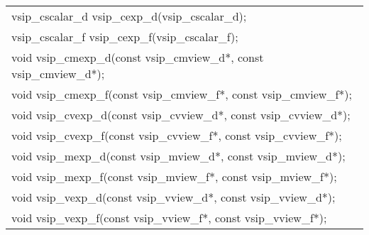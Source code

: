 \\\cvsiplh
\afh
\\\hspace*{.04\textwidth} {
\ttfamily
\begin{tabular}[H]{l}
vsip\_cscalar\_d vsip\_cexp\_d(vsip\_cscalar\_d);\\
vsip\_cscalar\_f vsip\_cexp\_f(vsip\_cscalar\_f);\\
void vsip\_cmexp\_d(const vsip\_cmview\_d*, const vsip\_cmview\_d*);\\
void vsip\_cmexp\_f(const vsip\_cmview\_f*, const vsip\_cmview\_f*);\\
void vsip\_cvexp\_d(const vsip\_cvview\_d*, const vsip\_cvview\_d*);\\
void vsip\_cvexp\_f(const vsip\_cvview\_f*, const vsip\_cvview\_f*);\\
void vsip\_mexp\_d(const vsip\_mview\_d*, const vsip\_mview\_d*);\\
void vsip\_mexp\_f(const vsip\_mview\_f*, const vsip\_mview\_f*);\\
void vsip\_vexp\_d(const vsip\_vview\_d*, const vsip\_vview\_d*);\\
void vsip\_vexp\_f(const vsip\_vview\_f*, const vsip\_vview\_f*);\\
\end{tabular}
}
\\\pyjvsiph
{}
